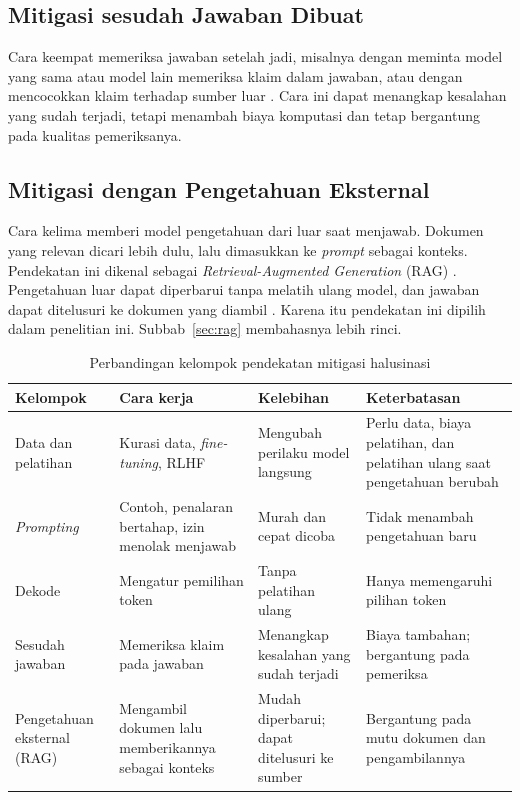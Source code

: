 \subsection{Mitigasi sesudah Jawaban Dibuat}

Cara keempat memeriksa jawaban setelah jadi, misalnya dengan meminta model yang sama atau model lain memeriksa klaim dalam jawaban, atau dengan mencocokkan klaim terhadap sumber luar \autocite{Huang2025}. Cara ini dapat menangkap kesalahan yang sudah terjadi, tetapi menambah biaya komputasi dan tetap bergantung pada kualitas pemeriksanya.

\subsection{Mitigasi dengan Pengetahuan Eksternal}

Cara kelima memberi model pengetahuan dari luar saat menjawab. Dokumen yang relevan dicari lebih dulu, lalu dimasukkan ke \emph{prompt} sebagai konteks. Pendekatan ini dikenal sebagai \emph{Retrieval-Augmented Generation} (RAG) \autocite{Lewis2020}. Pengetahuan luar dapat diperbarui tanpa melatih ulang model, dan jawaban dapat ditelusuri ke dokumen yang diambil \autocite{YizhengHuang2026, WangXL2026}. Karena itu pendekatan ini dipilih dalam penelitian ini. Subbab~\ref{sec:rag} membahasnya lebih rinci.

\begin{table}[!htbp]
\centering
\caption{Perbandingan kelompok pendekatan mitigasi halusinasi
\autocite{Huang2025, Patil2024, WangXL2026}}
\label{tab:kelompok-mitigasi}
\small
\begin{tabular}{|p{2.4cm}|p{3.6cm}|p{3.4cm}|p{3.4cm}|}
\hline
\textbf{Kelompok} & \textbf{Cara kerja} & \textbf{Kelebihan} & \textbf{Keterbatasan} \\
\hline
Data dan pelatihan &
Kurasi data, \emph{fine-tuning}, RLHF &
Mengubah perilaku model langsung &
Perlu data, biaya pelatihan, dan pelatihan ulang saat pengetahuan berubah \\
\hline
\emph{Prompting} &
Contoh, penalaran bertahap, izin menolak menjawab &
Murah dan cepat dicoba &
Tidak menambah pengetahuan baru \\
\hline
Dekode &
Mengatur pemilihan token &
Tanpa pelatihan ulang &
Hanya memengaruhi pilihan token \\
\hline
Sesudah jawaban &
Memeriksa klaim pada jawaban &
Menangkap kesalahan yang sudah terjadi &
Biaya tambahan; bergantung pada pemeriksa \\
\hline
Pengetahuan eksternal (RAG) &
Mengambil dokumen lalu memberikannya sebagai konteks &
Mudah diperbarui; dapat ditelusuri ke sumber &
Bergantung pada mutu dokumen dan pengambilannya \\
\hline
\end{tabular}
\end{table}

